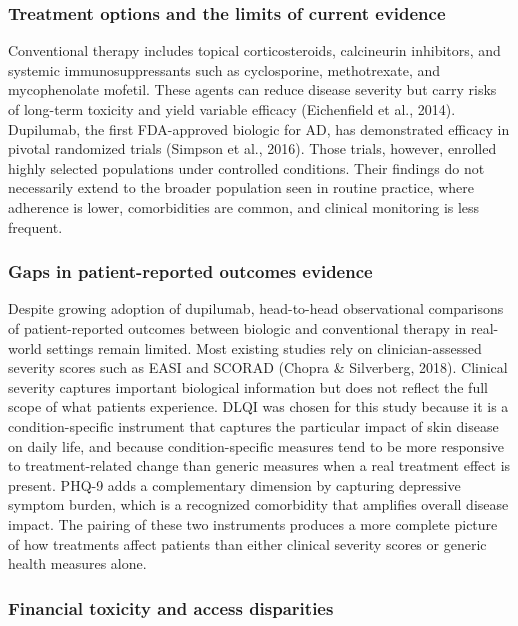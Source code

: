 \documentclass[
]{agujournal2019}
\begin{document}
\subsubsection{Treatment options and the limits of current
evidence}\label{treatment-options-and-the-limits-of-current-evidence}

Conventional therapy includes topical corticosteroids, calcineurin
inhibitors, and systemic immunosuppressants such as cyclosporine,
methotrexate, and mycophenolate mofetil. These agents can reduce disease
severity but carry risks of long-term toxicity and yield variable
efficacy (Eichenfield et al., 2014). Dupilumab, the first FDA-approved
biologic for AD, has demonstrated efficacy in pivotal randomized trials
(Simpson et al., 2016). Those trials, however, enrolled highly selected
populations under controlled conditions. Their findings do not
necessarily extend to the broader population seen in routine practice,
where adherence is lower, comorbidities are common, and clinical
monitoring is less frequent.

\subsubsection{Gaps in patient-reported outcomes
evidence}\label{gaps-in-patient-reported-outcomes-evidence}

Despite growing adoption of dupilumab, head-to-head observational
comparisons of patient-reported outcomes between biologic and
conventional therapy in real-world settings remain limited. Most
existing studies rely on clinician-assessed severity scores such as EASI
and SCORAD (Chopra \& Silverberg, 2018). Clinical severity captures
important biological information but does not reflect the full scope of
what patients experience. DLQI was chosen for this study because it is a
condition-specific instrument that captures the particular impact of
skin disease on daily life, and because condition-specific measures tend
to be more responsive to treatment-related change than generic measures
when a real treatment effect is present. PHQ-9 adds a complementary
dimension by capturing depressive symptom burden, which is a recognized
comorbidity that amplifies overall disease impact. The pairing of these
two instruments produces a more complete picture of how treatments
affect patients than either clinical severity scores or generic health
measures alone.

\subsubsection{Financial toxicity and access
disparities}\label{financial-toxicity-and-access-disparities}
\end{document}

